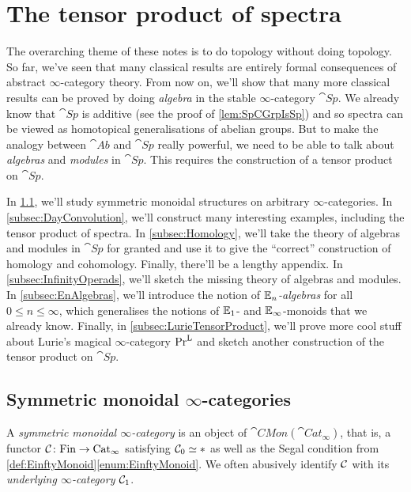 \section{The tensor product of spectra}\label{sec:TensorProduct}
The overarching theme of these notes is to do topology without doing topology. So far, we've seen that many classical results are entirely formal consequences of abstract $\infty$-category theory. From now on, we'll show that many more classical results can be proved by doing \emph{algebra} in the stable $\infty$-category $\cat{Sp}$. We already know that $\cat{Sp}$ is additive (see the proof of \cref{lem:SpCGrpIsSp}) and so spectra can be viewed as homotopical generalisations of abelian groups. But to make the analogy between $\cat{Ab}$ and $\cat{Sp}$ really powerful, we need to be able to talk about \emph{algebras} and \emph{modules} in $\cat{Sp}$. This requires the construction of a tensor product on $\cat{Sp}$.

In \cref{subsec:SymmetricMonoidal}, we'll study symmetric monoidal structures on arbitrary $\infty$-categories. In \cref{subsec:DayConvolution}, we'll construct many interesting examples, including the tensor product of spectra. In \cref{subsec:Homology}, we'll take the theory of algebras and modules in $\cat{Sp}$ for granted and use it to give the \enquote{correct} construction of homology and cohomology. Finally, there'll be a lengthy appendix. In \cref{subsec:InfinityOperads}, we'll sketch the missing theory of algebras and modules. In \cref{subsec:EnAlgebras}, we'll introduce the notion of \emph{$\mathbb{E}_n$-algebras} for all $0\leqslant n\leqslant \infty$, which generalises the notions of $\mathbb{E}_1$- and $\mathbb{E}_\infty$-monoids that we already know. Finally, in \cref{subsec:LurieTensorProduct}, we'll prove more cool stuff about Lurie's magical $\infty$-category $\mathrm{Pr}^{\mathrm{L}}$ and sketch another construction of the tensor product on $\cat{Sp}$.


\subsection{Symmetric monoidal \texorpdfstring{$\infty$}{Infinity}-categories}\label{subsec:SymmetricMonoidal}
\begin{defi}\label{def:SymmetricMonoidal}
	A \emph{symmetric monoidal $\infty$-category} is an object of $\cat{CMon}(\cat{Cat}_\infty)$, that is, a functor $\mathcal{C}\colon \mathrm{Fin}\rightarrow \mathrm{Cat}_\infty$ satisfying $\mathcal{C}_0\simeq *$ as well as the Segal condition from \cref{def:EinftyMonoid}\cref{enum:EinftyMonoid}. We often abusively identify $\mathcal{C}$ with its \emph{underlying $\infty$-category} $\mathcal{C}_1$.
\end{defi}

